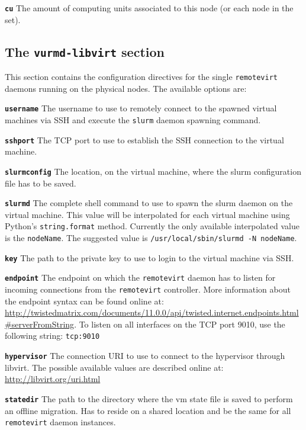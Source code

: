 \textbf{\texttt{cu}} The amount of computing units associated to this node (or each node in the set).


\subsection{The \texttt{vurmd-libvirt} section}

This section contains the configuration directives for the single \texttt{remotevirt} daemons running on the physical nodes. The available options are:

\textbf{\texttt{username}} The username to use to remotely connect to the spawned virtual machines via SSH and execute the \texttt{slurm} daemon spawning command.

\textbf{\texttt{sshport}} The TCP port to use to establish the SSH connection to the virtual machine.

\textbf{\texttt{slurmconfig}} The location, on the virtual machine, where the \gls{slurm} configuration file has to be saved.

\textbf{\texttt{slurmd}} The complete shell command to use to spawn the \gls{slurm} daemon on the virtual machine. This value will be interpolated for each virtual machine using Python's \texttt{string.format} method. Currently the only available interpolated value is the \texttt{nodeName}. The suggested value is \texttt{/usr/local/sbin/slurmd -N {nodeName}}.

\textbf{\texttt{key}} The path to the private key to use to login to the virtual machine via SSH.

\textbf{\texttt{endpoint}} The endpoint on which the \texttt{remotevirt} daemon has to listen for incoming connections from the \texttt{remotevirt} controller. More information about the endpoint syntax can be found online at: \url{http://twistedmatrix.com/documents/11.0.0/api/twisted.internet.endpoints.html#serverFromString}. To listen on all interfaces on the TCP port 9010, use the following string: \texttt{tcp:9010}

\textbf{\texttt{hypervisor}} The connection URI to use to connect to the hypervisor through libvirt. The possible available values are described online at: \url{http://libvirt.org/uri.html}

\textbf{\texttt{statedir}} The path to the directory where the \gls{vm} state file is saved to perform an offline migration. Has to reside on a shared location and be the same for all \texttt{remotevirt} daemon instances.

